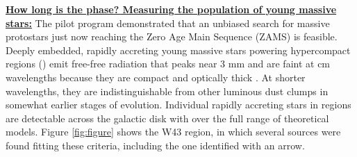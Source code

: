 \documentclass[11pt,preprint]{aastex_nofoot}
\begin{document}
% 
% 




\underline{\textbf{\helv How long is the \hchii phase?  Measuring the population of young massive stars:}}
The pilot program demonstrated that an unbiased search for massive protostars
just now reaching the Zero Age Main Sequence (ZAMS) is feasible.  Deeply
embedded, rapidly accreting young massive stars powering hypercompact \hii
regions (\hchii) emit free-free radiation that peaks near 3 mm and are faint at
cm wavelengths because they are compact and optically thick \citep[e.g.,
G20.08N][]{Galvan-Madrid2009a}.  At shorter wavelengths, they are
indistinguishable from other luminous dust clumps in somewhat earlier stages of
evolution.  Individual rapidly accreting stars in \hchii regions are
detectable across the galactic disk with \MGPS over the full range of
theoretical models.  Figure \ref{fig:figure} shows the W43 region, in which
several sources were found fitting these criteria, including the one identified
with an arrow.
\end{document}
